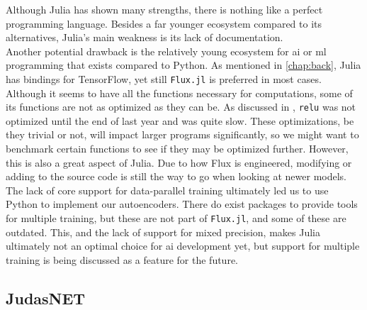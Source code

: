 Although Julia has shown many strengths, there is nothing like a perfect programming language. Besides a far younger ecosystem compared to its alternatives, Julia's main weakness is its lack of documentation. \\

Another potential drawback is the relatively young ecosystem for \acrshort{ai} or \acrshort{ml} programming that exists compared to Python. As mentioned in \ref{chap:back}, Julia has bindings for TensorFlow, yet still \texttt{Flux.jl} is preferred in most cases. Although it seems to have all the functions necessary for computations, some of its functions are not as optimized as they can be. As discussed in \cite{projthesis}, \lstinline|relu| was not optimized until the end of last year and was quite slow. These optimizations, be they trivial or not, will impact larger programs significantly, so we might want to benchmark certain functions to see if they may be optimized further. However, this is also a great aspect of Julia. Due to how Flux is engineered, modifying or adding to the source code is still the way to go when looking at newer models. \\

The lack of core support for data-parallel training ultimately led us to use Python to implement our autoencoders. There do exist packages to provide tools for multiple training, but these are not part of \texttt{Flux.jl}, and some of these are outdated. This, and the lack of support for mixed precision, makes Julia ultimately not an optimal choice for \acrshort{ai} development yet, but support for multiple training is being discussed as a feature for the future.

\subsection*{JudasNET}
\label{disc:judasnet}

